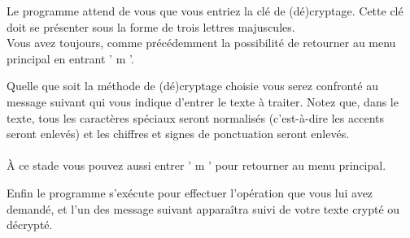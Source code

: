 \documentclass[a4paper,12pt,abstracton,titlepage]{scrartcl}
\begin{document}
\vspace{0.5cm}
{
\label{FE}
}
\vspace{0.5cm}

Le programme attend de vous que vous entriez la clé de (dé)cryptage. Cette clé doit se présenter sous la forme de trois lettres majuscules.\\
Vous avez toujours, comme précédemment la possibilité de retourner au menu principal en entrant ' m '.
\vspace{1cm}

Quelle que soit la méthode de (dé)cryptage choisie vous serez confronté au message suivant qui vous indique d'entrer le texte à traiter. Notez que, dans le texte, tous les caractères spéciaux seront normalisés (c'est-à-dire les accents seront enlevés) et les chiffres et signes de ponctuation seront enlevés.\\
\\
À ce stade vous pouvez aussi entrer ' m ' pour retourner au menu principal.

\vspace{0.5cm}
{
\label{FIT}
}
\vspace{0.5cm}

\newpage
Enfin le programme s'exécute pour effectuer l'opération que vous lui avez demandé, et l'un des message suivant apparaîtra suivi de votre texte crypté ou décrypté.

\vspace{0.5cm}
{
\label{FSCT}
\vspace{0.7cm}
\label{FSDT}
}
\vspace{0.7cm}
\end{document}
